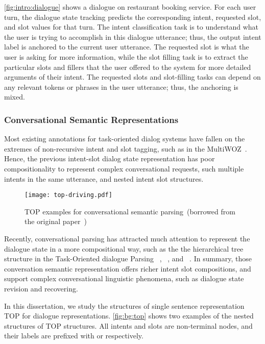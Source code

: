 \autoref{fig:intro:dialogue} shows a dialogue on restaurant booking
service. For each user turn, the dialogue state tracking predicts the
corresponding intent, requested slot, and slot values for that
turn. The intent classification task is to understand what the user is
trying to accomplish in this dialogue utterance; thus, the output
intent label is anchored to the current user utterance. The requested
slot is what the user is asking for more information, while the slot
filling task is to extract the particular slots and fillers that the
user offered to the system for more detailed arguments of their
intent. The requested slots and slot-filling tasks can depend on any
relevant tokens or phrases in the user utterance; thus, the anchoring
is mixed.

\subsubsection{Conversational Semantic Representations}
\label{ssec:bg:dialogue-rep}
Most existing annotations for task-oriented dialog systems have fallen
on the extremes of non-recursive intent and slot tagging, such as in
the MultiWOZ~\citep{budzianowski2018multiwoz}. Hence, the previous
intent-slot dialog state representation has poor compositionality to
represent complex conversational requests, such multiple intents in the
same utterance, and nested intent slot structures.

\begin{figure}[!th]
\centering
\texttt{[image: top-driving.pdf]}
\caption{\label{fig:bg:top} TOP examples for conversational
  semantic parsing~(borrowed from the original
  paper~\citep{gupta-etal-2018-semantic-parsing})}
\end{figure}
Recently, conversational parsing has attracted much attention to
represent the dialogue state in a more compositional way, such as the
the hierarchical tree structure in the Task-Oriented dialogue Parsing
~\cite[TOP,][]{gupta-etal-2018-semantic-parsing,aghajanyan2020conversational},
~\cite[TreeDST,][]{cheng2020conversational}, and
~\cite[Dataflow,][]{andreas2020task}. In summary, those conversation
semantic representation offers richer intent slot compositions, and
support complex conversational linguistic phenomena, such as dialogue
state revision and recovering.

In this dissertation, we study the structures of single sentence
representation TOP for dialogue
representations. \autoref{fig:bg:top} shows two examples of the
nested structures of TOP structures. All intents and slots are
non-terminal nodes, and their labels are prefixed with  or
 respectively.

